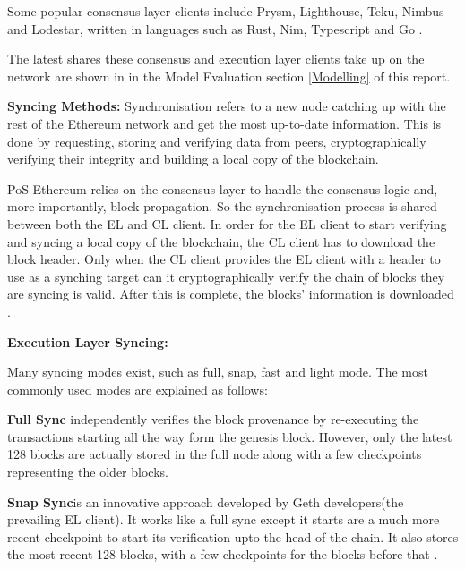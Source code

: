 Some popular consensus layer clients include Prysm, Lighthouse, Teku, Nimbus and Lodestar, written in languages 
 such as Rust, Nim, Typescript and Go \cite{EthereumEthereum.org}. 

The latest shares these consensus and execution layer clients take up on the network are shown in  in the Model Evaluation section \ref{Modelling} of this report.

\textbf{Syncing Methods:} \newline 
Synchronisation refers to a new node catching up with the rest of the Ethereum network and get the most up-to-date information. This is done by requesting, storing and verifying data from peers, cryptographically verifying their integrity and building a local copy of the blockchain.

PoS Ethereum relies on the consensus layer to handle the consensus logic and, more importantly, block propagation. So the synchronisation process is shared between both the EL and CL client. In order for the EL client to start verifying and syncing a local copy of the blockchain, the CL client has to download the block header. Only when the CL client provides the EL client with a header to use as a synching target can it cryptographically verify the chain of blocks they are syncing is valid. After this is complete, the blocks' information is downloaded \cite{2022DeveloperGo-ethereum}.

\textbf{Execution Layer Syncing: } 

Many syncing modes exist, such as full, snap, fast and light mode. The most commonly used modes are explained as follows: 

\textbf{Full Sync } independently verifies the block provenance by re-executing the transactions starting all the way form the genesis block. However, only the latest 128 blocks are actually stored in the full node along with a few checkpoints representing the older blocks. 

\textbf{Snap Sync}is an innovative approach developed by Geth developers(the prevailing EL client). It works like a full sync except it starts are a much more recent checkpoint to start its verification upto the head of the chain. It also stores the most recent 128 blocks, with a few checkpoints for the blocks before that \cite{2022DeveloperGo-ethereum}.





